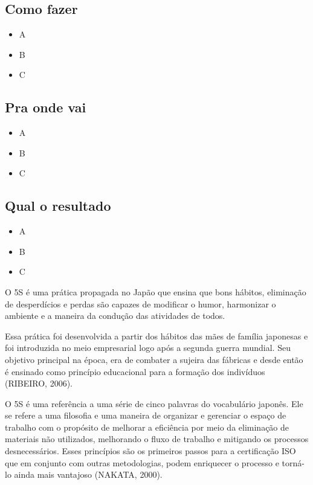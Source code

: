 \documentclass[
]{article}
\providecommand{\tightlist}{%
  \setlength{\itemsep}{0pt}\setlength{\parskip}{0pt}}
\begin{document}
\hypertarget{como-fazer-9}{%
\subsection*{Como fazer}\label{como-fazer-9}}

\begin{itemize}
\tightlist
\item
  A
\item
  B
\item
  C
\end{itemize}

\hypertarget{pra-onde-vai-9}{%
\subsection*{Pra onde vai}\label{pra-onde-vai-9}}

\begin{itemize}
\tightlist
\item
  A
\item
  B
\item
  C
\end{itemize}

\hypertarget{qual-o-resultado-9}{%
\subsection*{Qual o resultado}\label{qual-o-resultado-9}}

\begin{itemize}
\tightlist
\item
  A
\item
  B
\item
  C
\end{itemize}

O 5S é uma prática propagada no Japão que ensina que bons hábitos, eliminação de desperdícios e perdas são capazes de modificar o humor, harmonizar o ambiente e a maneira da condução das atividades de todos.

Essa prática foi desenvolvida a partir dos hábitos das mães de família japonesas e foi introduzida no meio empresarial logo após a segunda guerra mundial. Seu objetivo principal na época, era de combater a sujeira das fábricas e desde então é ensinado como princípio educacional para a formação dos indivíduos (RIBEIRO, 2006).

O 5S é uma referência a uma série de cinco palavras do vocabulário japonês. Ele se refere a uma filosofia e uma maneira de organizar e gerenciar o espaço de trabalho com o propósito de melhorar a eficiência por meio da eliminação de materiais não utilizados, melhorando o fluxo de trabalho e mitigando os processos desnecessários. Esses princípios são os primeiros passos para a certificação ISO que em conjunto com outras metodologias, podem enriquecer o processo e torná-lo ainda mais vantajoso (NAKATA, 2000).
\end{document}
